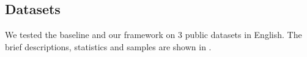 \begin{comment}
\begin{table}[th]
\setlength\tabcolsep{3pt}
\centering
\scriptsize
\resizebox{\linewidth}{!}{\begin{tabular}{lp{1.8cm}p{1.8cm}p{1.8cm}}
\toprule
 &    \textbf{CANARD} & \textbf{CQR} & \textbf{MuDoCo} \\ \midrule
Desc. &	\tabincell{l}{Teacher and \\student talking \\about a news title \\or a person.}	&	\tabincell{l}{Task-oriented \\dialogue between a \\user and an agent.}	&	\tabincell{l}{Daily conversation \\of six domains.}	\\ \midrule
Train & 16.88k  & 0.52k &  2.39k \\
Dev  & 1.79k & 0.06k & 0.29k  \\
Test &   2.96k & 0.06k & 0.30k  \\
Ave Len    & 429.77  & 143.70 & 73.43  \\
\% rewrite & 0.9291 & 0.9838 & 0.2668  \\
\bottomrule
\end{tabular}}
\caption{Descriptions of the datasets. ``Ave Len'' means the average length of context. ``\% rewrite'' denotes 
the percentage of samples whose current utterance is actually rewritten.}
\label{tab:statitics-datasets}
\end{table}
\end{comment}

\subsection{Datasets}
We tested the baseline and our framework on 3 public datasets in English.
The brief descriptions, statistics and samples are shown in .


